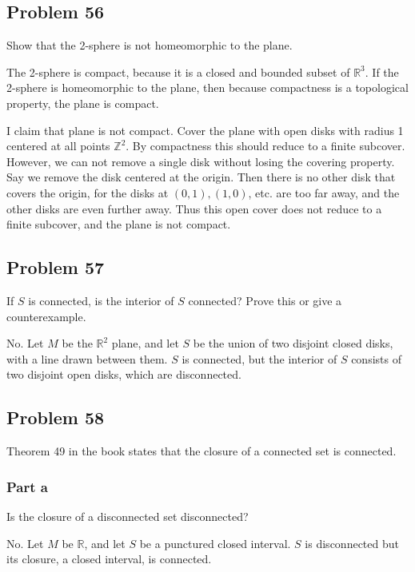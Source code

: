 \documentclass{article}
\newcommand{\Z}{\mathbb{Z}}
\newcommand{\R}{\mathbb{R}}
\begin{document}
\subsection*{Problem 56}

Show that the 2-sphere is not homeomorphic to the plane.

The 2-sphere is compact, because it is a closed and bounded subset of $\R^3$. If the 2-sphere is homeomorphic to the plane, then because compactness is a topological property, the plane is compact.

I claim that plane is not compact. Cover the plane with open disks with radius 1 centered at all points $\Z^2$. By compactness this should reduce to a finite subcover. However, we can not remove a single disk without losing the covering property. Say we remove the disk centered at the origin. Then there is no other disk that covers the origin, for the disks at $(0, 1), (1, 0)$, etc. are too far away, and the other disks are even further away. Thus this open cover does not reduce to a finite subcover, and the plane is not compact.

\subsection*{Problem 57}

If $S$ is connected, is the interior of $S$ connected? Prove this or give a counterexample.

No. Let $M$ be the $\R^2$ plane, and let $S$ be the union of two disjoint closed disks, with a line drawn between them. $S$ is connected, but the interior of $S$ consists of two disjoint open disks, which are disconnected.

\subsection*{Problem 58}

Theorem 49 in the book states that the closure of a connected set is connected.

\subsubsection*{Part a}

Is the closure of a disconnected set disconnected?

No. Let $M$ be $\R$, and let $S$ be a punctured closed interval. $S$ is disconnected but its closure, a closed interval, is connected.
\end{document}
